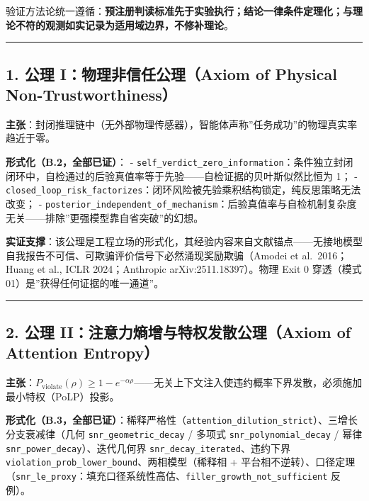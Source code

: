 验证方法论统一遵循：\textbf{预注册判读标准先于实验执行；结论一律条件定理化；与理论不符的观测如实记录为适用域边界，不修补理论}。

\begin{center}\rule{0.5\linewidth}{0.5pt}\end{center}

\subsection{1. 公理 I：物理非信任公理（Axiom of Physical
Non-Trustworthiness）}\label{ux516cux7406-iux7269ux7406ux975eux4fe1ux4efbux516cux7406axiom-of-physical-non-trustworthiness-1}

\textbf{主张}：封闭推理链中（无外部物理传感器），智能体声称''任务成功''的物理真实率趋近于零。

\textbf{形式化（B.2，全部已证）}： -
\texttt{self\_verdict\_zero\_information}：条件独立封闭闭环中，自检通过的后验真值率等于先验------自检证据的贝叶斯似然比恒为
1； -
\texttt{closed\_loop\_risk\_factorizes}：闭环风险被先验乘积结构锁定，纯反思策略无法改变；
-
\texttt{posterior\_independent\_of\_mechanism}：后验真值率与自检机制复杂度无关------排除''更强模型靠自省突破''的幻想。

\textbf{实证支撑}：该公理是工程立场的形式化，其经验内容来自文献锚点------无接地模型自我报告不可信、可欺骗评价信号下必然涌现奖励欺骗（Amodei
et al.~2016；Huang et al., ICLR 2024；Anthropic arXiv:2511.18397）。物理
Exit 0 穿透（模式 01）是''获得任何证据的唯一通道''。

\begin{center}\rule{0.5\linewidth}{0.5pt}\end{center}

\subsection{2. 公理 II：注意力熵增与特权发散公理（Axiom of Attention
Entropy）}\label{ux516cux7406-iiux6ce8ux610fux529bux71b5ux589eux4e0eux7279ux6743ux53d1ux6563ux516cux7406axiom-of-attention-entropy-1}

\textbf{主张}：\(P_{\text{violate}}(\rho) \ge 1 - e^{-\alpha\rho}\)------无关上下文注入使违约概率下界发散，必须施加最小特权（PoLP）投影。

\textbf{形式化（B.3，全部已证）}：稀释严格性（\texttt{attention\_dilution\_strict}）、三增长分支衰减律（几何
\texttt{snr\_geometric\_decay} / 多项式 \texttt{snr\_polynomial\_decay}
/ 幂律 \texttt{snr\_power\_decay}）、迭代几何界
\texttt{snr\_decay\_iterated}、违约下界
\texttt{violation\_prob\_lower\_bound}、两相模型（稀释相 +
平台相不逆转）、口径定理（\texttt{snr\_le\_proxy}：填充口径系统性高估、\texttt{filler\_growth\_not\_sufficient}
反例）。

